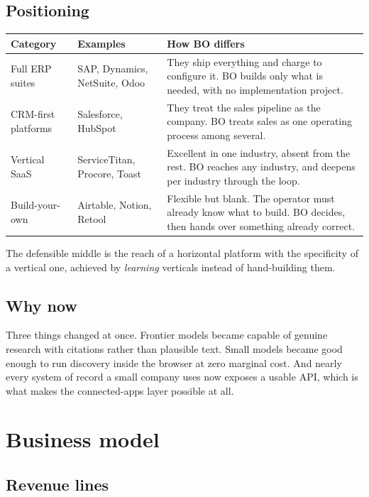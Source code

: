 \documentclass[11pt,a4paper]{article}
\begin{document}
\subsection{Positioning}

\begin{center}
\small
\begin{tabular}{@{}l p{4.2cm} p{6.0cm}@{}}
\toprule
\textbf{Category} & \textbf{Examples} & \textbf{How BO differs} \\
\midrule
Full ERP suites     & SAP, Dynamics, NetSuite, Odoo & They ship everything and charge to configure it. BO builds only what is needed, with no implementation project. \\
CRM-first platforms & Salesforce, HubSpot           & They treat the sales pipeline as the company. BO treats sales as one operating process among several. \\
Vertical SaaS       & ServiceTitan, Procore, Toast  & Excellent in one industry, absent from the rest. BO reaches any industry, and deepens per industry through the loop. \\
Build-your-own      & Airtable, Notion, Retool      & Flexible but blank. The operator must already know what to build. BO decides, then hands over something already correct. \\
\bottomrule
\end{tabular}
\end{center}

The defensible middle is the reach of a horizontal platform with the specificity of a vertical one,
achieved by \emph{learning} verticals instead of hand-building them.

\subsection{Why now}

Three things changed at once. Frontier models became capable of genuine research with citations
rather than plausible text. Small models became good enough to run discovery inside the browser at
zero marginal cost. And nearly every system of record a small company uses now exposes a usable API,
which is what makes the connected-apps layer possible at all.

\section{Business model}

\subsection{Revenue lines}
\end{document}
